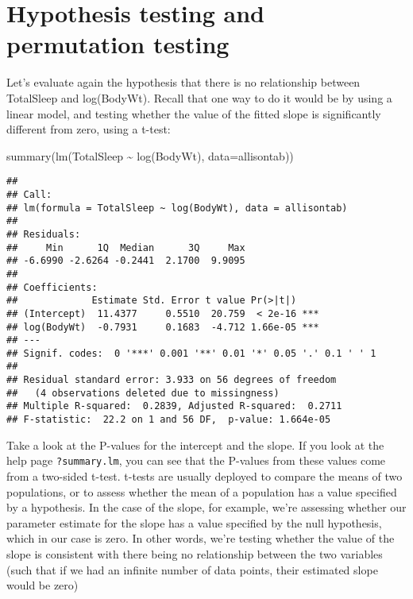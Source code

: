 \documentclass[
]{book}
\newenvironment{Shaded}{\begin{snugshade}}{\end{snugshade}}
\newcommand{\AttributeTok}[1]{\textcolor[rgb]{0.77,0.63,0.00}{#1}}
\newcommand{\FunctionTok}[1]{\textcolor[rgb]{0.00,0.00,0.00}{#1}}
\newcommand{\NormalTok}[1]{#1}
\newcommand{\SpecialCharTok}[1]{\textcolor[rgb]{0.00,0.00,0.00}{#1}}
\begin{document}
\hypertarget{hypothesis-testing-and-permutation-testing}{%
\section{Hypothesis testing and permutation testing}\label{hypothesis-testing-and-permutation-testing}}

Let's evaluate again the hypothesis that there is no relationship between TotalSleep and log(BodyWt). Recall that one way to do it would be by using a linear model, and testing whether the value of the fitted slope is significantly different from zero, using a t-test:

\begin{Shaded}
\begin{Highlighting}[]
\FunctionTok{summary}\NormalTok{(}\FunctionTok{lm}\NormalTok{(TotalSleep }\SpecialCharTok{\textasciitilde{}} \FunctionTok{log}\NormalTok{(BodyWt), }\AttributeTok{data=}\NormalTok{allisontab))}
\end{Highlighting}
\end{Shaded}

\begin{verbatim}
## 
## Call:
## lm(formula = TotalSleep ~ log(BodyWt), data = allisontab)
## 
## Residuals:
##     Min      1Q  Median      3Q     Max 
## -6.6990 -2.6264 -0.2441  2.1700  9.9095 
## 
## Coefficients:
##             Estimate Std. Error t value Pr(>|t|)    
## (Intercept)  11.4377     0.5510  20.759  < 2e-16 ***
## log(BodyWt)  -0.7931     0.1683  -4.712 1.66e-05 ***
## ---
## Signif. codes:  0 '***' 0.001 '**' 0.01 '*' 0.05 '.' 0.1 ' ' 1
## 
## Residual standard error: 3.933 on 56 degrees of freedom
##   (4 observations deleted due to missingness)
## Multiple R-squared:  0.2839, Adjusted R-squared:  0.2711 
## F-statistic:  22.2 on 1 and 56 DF,  p-value: 1.664e-05
\end{verbatim}

Take a look at the P-values for the intercept and the slope. If you look at the help page \texttt{?summary.lm}, you can see that the P-values from these values come from a two-sided t-test. t-tests are usually deployed to compare the means of two populations, or to assess whether the mean of a population has a value specified by a hypothesis. In the case of the slope, for example, we're assessing whether our parameter estimate for the slope has a value specified by the null hypothesis, which in our case is zero. In other words, we're testing whether the value of the slope is consistent with there being no relationship between the two variables (such that if we had an infinite number of data points, their estimated slope would be zero)
\end{document}
